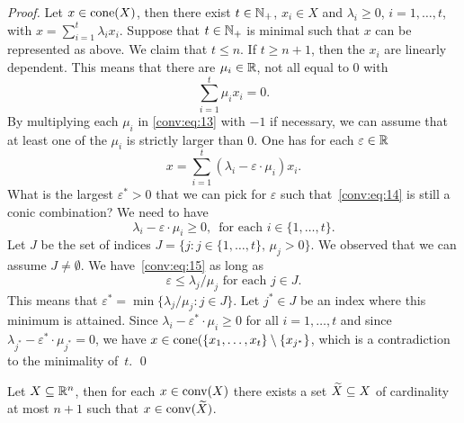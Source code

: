\begin{proof}
  Let $x \in \mathrm{cone}(X)$, then there exist $t \in \mathbb{N}_+$, $x_i \in X$ and
  $\lambda_i\geq0$, $i=1,\ldots,t$, with  $ x = \sum_{i=1}^t \lambda_i x_i$.
  Suppose that $t\in \mathbb{N}_+$ is minimal such that $x$ can be represented
  as   above. We claim that $t \leq n$. If $t\geq n+1$, then the $x_i$ are
  linearly dependent.  This means that there are $\mu_i \in \mathbb{R}$, not all
  equal to $0$ with   
  \begin{equation}
    \label{conv:eq:13}
    \sum_{i=1}^t \mu_i x_i = 0.
  \end{equation}
 By multiplying each
  $\mu_i$ in \eqref{conv:eq:13} with   $-1$ if necessary, we can  assume
  that at least one of the  $\mu_i$ is strictly larger than $0$.  
  One
  has for each $\varepsilon \in \mathbb{R}$  
  \begin{equation}
    \label{conv:eq:14}
    x = \sum_{i=1}^t (\lambda_i - \varepsilon \cdot \mu_i) x_i. 
  \end{equation}
  What is the largest $\varepsilon^*>0$ that we can pick for $\varepsilon$ such
  that~\eqref{conv:eq:14} is still a conic combination? We need to have
  \begin{equation}
    \label{conv:eq:15}
      \lambda_i - \varepsilon \cdot \mu_i \geq0, \,\text{  for each }i \in \{1,\ldots,t\}. 
  \end{equation} 
   Let $J$ be the set of indices $J = \{j  \colon j \in \{1,\ldots,t\}, \, \mu_j
   >0\}$. We observed that we can assume $J \neq \emptyset$. 
We have~\eqref{conv:eq:15} as long as 
  \begin{equation}
    \label{conv:eq:16}
    \varepsilon \leq  \lambda_j / \mu_j \text{ for each } j \in J.
  \end{equation}
This means that $\varepsilon^* = \min\{ \lambda_j / \mu_j \colon j \in J\}$.  Let $j^*\in J$
be an index where this minimum is attained.  
Since $\lambda_i - \varepsilon^* \cdot \mu_i \geq0$ for all $i=1,\ldots,t$ and since
$\lambda_{j^*}-\varepsilon^*\cdot\mu_{j^*}=0$, we have $x \in  \mathrm{cone}(\{x_1,\ldots,x_t\}\setminus
\{x_{j^*}\}$, which is a contradiction to the minimality of~$t$.
\qed
\end{proof}


\begin{corollary}
  \label{conv:co:1}
  Let $X\subseteq\mathbb{R}^n$, then for each $x \in \operatorname{conv}(X)$ there exists a set
  $\widetilde{X}\subseteq X$ of cardinality at most $n+1$ such that $x \in
  \operatorname{conv}(\widetilde{X})$. 
\end{corollary}




